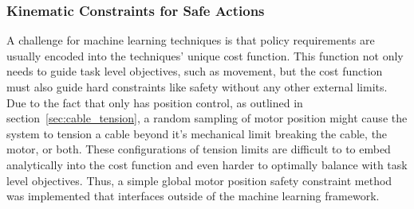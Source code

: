 



\subsubsection{Kinematic Constraints for Safe Actions}

A challenge for machine learning techniques is that policy requirements are usually encoded into the techniques' unique cost function.
This function not only needs to guide task level objectives, such as movement, but the cost function must also guide hard constraints like safety without any other external limits.
Due to the fact that \SB{} only has position control, as outlined in section~\ref{sec:cable_tension}, a random sampling of motor position might cause the system to tension a cable beyond it's mechanical limit breaking the cable, the motor, or both.
These configurations of tension limits are difficult to to embed analytically into the cost function and even harder to optimally balance with task level objectives.
Thus, a simple global motor position safety constraint method was implemented that interfaces outside of the machine learning framework.

